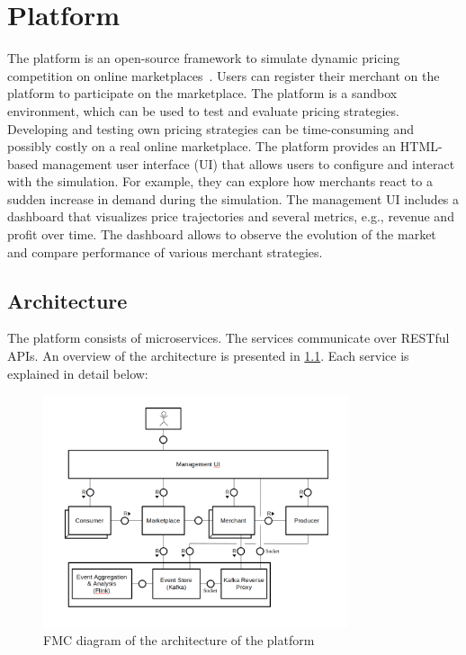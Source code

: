 
\chapter{\pricewars Platform}

The \pricewars platform is an open-source framework to simulate dynamic pricing competition on online marketplaces~\cite{DBLP:conf/recsys/0001SPSBLLSU17, edoc2017pricewars}.
Users can register their merchant on the platform to participate on the marketplace.
The platform is a sandbox environment, which can be used to test and evaluate pricing strategies. %
Developing and testing own pricing strategies can be time-consuming and possibly costly on a real online marketplace.
The platform provides an HTML-based management user interface (UI) that allows users to configure and interact with the simulation.
For example, they can explore how merchants react to a sudden increase in demand during the simulation.
The management UI includes a dashboard that visualizes price trajectories and several metrics, e.g., revenue and profit over time.
The dashboard allows to observe the evolution of the market and compare performance of various merchant strategies.

\section{Architecture}
The \pricewars platform consists of microservices.
The services communicate over RESTful APIs.
An overview of the architecture is presented in \cref{fig:platform_architecture}.
Each service is explained in detail below:

\begin{figure}
	\centering
	\includegraphics[width=0.8\textwidth]{figures/architecture_placeholder.png}
	\caption[see this in list of figures]
	{FMC diagram of the architecture of the \pricewars platform}
	\label{fig:platform_architecture}
\end{figure}

